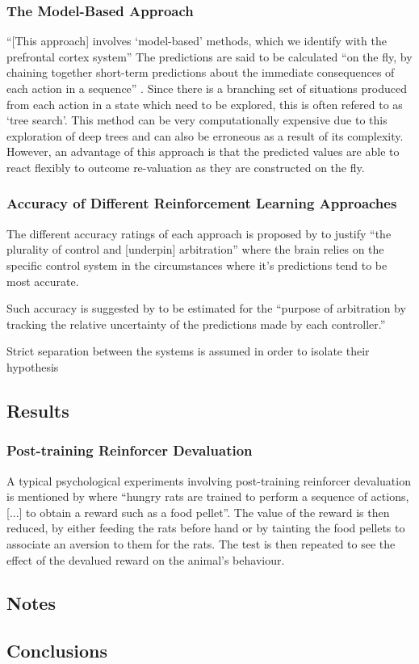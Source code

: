 \documentclass[10pt]{article}
\begin{document}
	\subsubsection{The Model-Based Approach}

		``[This approach] involves `model-based' methods, which we identify with the prefrontal cortex system'' \parencite{Daw} The predictions are said to be calculated ``on the fly, by chaining together short-term predictions about the immediate consequences of each action in a sequence'' \parencite{Daw}. Since there is a branching set of situations produced from each action in a state which need to be explored, this is often refered to as `tree search'. 
		This method can be very computationally expensive due to this exploration of deep trees and can also be erroneous as a result of its complexity. 
		However, an advantage of this approach is that the predicted values are able to react flexibly to outcome re-valuation as they are constructed on the fly.

	\subsubsection{Accuracy of Different Reinforcement Learning Approaches}

		The different accuracy ratings of each approach is proposed by \textcite{Daw} to justify ``the plurality of control and [underpin] arbitration'' where the brain relies on the specific control system in the circumstances where it's predictions tend to be most accurate.

		Such accuracy is suggested by \textcite{Daw} to be estimated for the ``purpose of arbitration by tracking the relative uncertainty of the predictions made by each controller.''

		Strict separation between the systems is assumed in order to isolate their hypothesis


	\subsection{Results}

	\subsubsection{Post-training Reinforcer Devaluation}

	A typical psychological experiments involving post-training reinforcer devaluation is mentioned by \textcite{Daw} where ``hungry rats are trained to perform a sequence of actions, [...] to obtain a reward such as a food pellet''. The value of the reward is then reduced, by either feeding the rats before hand or by tainting the food pellets to associate an aversion to them for the rats. The test is then repeated to see the effect of the devalued reward on the animal's behaviour. 


\subsection{Notes}

\subsection{Conclusions}

\printbibliography
\end{document}
